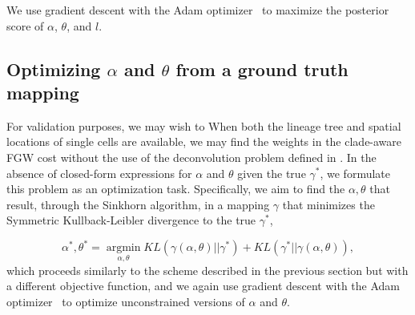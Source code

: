 \documentclass{article}
\newcommand{\toolnamex}{SpOTr }
\begin{document}
We use gradient descent with the Adam optimizer~\cite{kingma2014adam} to maximize the posterior score of $\alpha$, $\theta$, and $l$. 

\subsection*{Optimizing $\alpha$ and $\theta$ from a ground truth mapping}
For validation purposes, we may wish to When both the lineage tree and spatial locations of single cells are available, we may find the weights in the clade-aware FGW cost without the use of the deconvolution problem defined in . In the absence of closed-form expressions for $\alpha$ and $\theta$ given the true $\gamma^*$, we formulate this problem as an optimization task. Specifically, we aim to find the $\alpha,\theta$ that result, through the Sinkhorn algorithm, in a mapping $\gamma$ that minimizes the Symmetric Kullback-Leibler divergence to the true $\gamma^*$,

\begin{equation}
\label{eq:kl_objective}
    \alpha^*, \theta^* = \operatorname*{argmin}_{\alpha, \theta} KL(\gamma(\alpha, \theta) || \gamma^*) + KL(\gamma^*|| \gamma(\alpha, \theta)),
\end{equation}
which proceeds similarly to the scheme described in the previous section but with a different objective function, and we again use gradient descent with the Adam optimizer~\cite{kingma2014adam} to optimize unconstrained versions of $\alpha$ and $\theta$.

\end{document}
